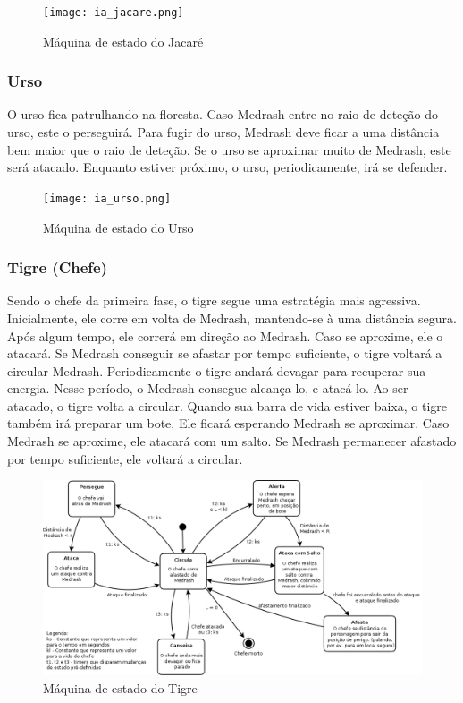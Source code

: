 \begin{figure}[!ht]
 \centering
 \texttt{[image: ia\_jacare.png]}
 \caption{Máquina de estado do Jacaré}
 \label{fsm:jacare}
\end{figure}

\subsubsection{Urso}

O urso fica patrulhando na floresta. Caso Medrash entre no raio de deteção
do urso, este o perseguirá. Para fugir do urso, Medrash deve ficar a uma
distância bem maior que o raio de deteção.
Se o urso se aproximar muito de Medrash, este será atacado. Enquanto estiver
próximo, o urso, periodicamente, irá se defender.

\begin{figure}[!ht]
 \centering
 \texttt{[image: ia\_urso.png]}
 \caption{Máquina de estado do Urso}
 \label{fsm:urso}
\end{figure}

\subsubsection{Tigre (Chefe)}

Sendo o chefe da primeira fase, o tigre segue uma estratégia mais agressiva.
Inicialmente, ele corre em volta de Medrash, mantendo-se à uma distância
 segura. Após algum tempo, ele correrá em direção ao Medrash. Caso se
 aproxime, ele o atacará. Se Medrash conseguir se afastar por tempo
 suficiente, o tigre voltará a circular Medrash.
Periodicamente o tigre andará devagar para recuperar sua energia. Nesse
período, o Medrash consegue alcança-lo, e atacá-lo. Ao ser atacado, o tigre
volta a circular.
Quando sua barra de vida estiver baixa, o tigre também irá preparar um
bote. Ele ficará esperando Medrash se aproximar. Caso Medrash se aproxime,
 ele atacará com um salto. Se Medrash permanecer afastado por tempo 
suficiente, ele voltará a circular.

\begin{figure}[!ht]
 \centering
 \includegraphics[scale=0.44]{ia_tigre.png}
 \caption{Máquina de estado do Tigre}
 \label{fsm:tigre}
\end{figure}

